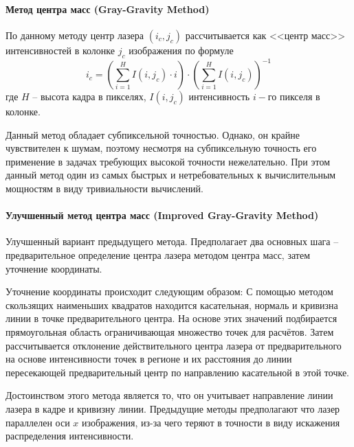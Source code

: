             \paragraph{Метод центра масс (Gray-Gravity Method)}
                По данному методу центр лазера $ (i_c, j_c) $ рассчитывается как <<центр масс>> интенсивностей в колонке $ j_c $ изображения по формуле
                \begin{equation}
                    i_c = \left(\sum\limits_{i=1}^{H}I(i, j_c)\cdot i\right)\cdot\left(\sum\limits_{i=1}^{H}I(i, j_c)\right)^{-1}
                \end{equation}
                где $ H $ -- высота кадра в пикселях, $ I(i, j_c) $ интенсивность $ i-\textit{го} $ пикселя в колонке.
                
                
                Данный метод обладает субпиксельной точностью\cite{Li2017}. Однако, он крайне чувствителен к шумам, поэтому несмотря на субпиксельную точность его применение в задачах требующих высокой точности нежелательно. При этом данный метод один из самых быстрых и нетребовательных к вычислительным мощностям в виду тривиальности вычислений.
                
            \paragraph{Улучшенный метод центра масс (Improved Gray-Gravity Method)}
                Улучшенный вариант предыдущего метода\cite{Li2017}. Предполагает два основных шага -- предварительное определение центра лазера методом центра масс, затем уточнение координаты.
                
                Уточнение координаты происходит следующим образом:
                С помощью методом скользящих наименьших квадратов находится касательная, нормаль и кривизна линии в точке предварительного центра. На основе этих значений подбирается прямоугольная область ограничивающая множество точек для расчётов. Затем рассчитывается отклонение действительного центра лазера от предварительного на основе интенсивности точек в регионе и их расстояния до линии пересекающей предварительный центр по направлению касательной в этой точке.
                
                Достоинством этого метода является то, что он учитывает направление линии лазера в кадре и кривизну линии. Предыдущие методы предполагают что лазер параллелен оси $ x $ изображения, из-за чего теряют в точности в виду искажения распределения интенсивности.
                
